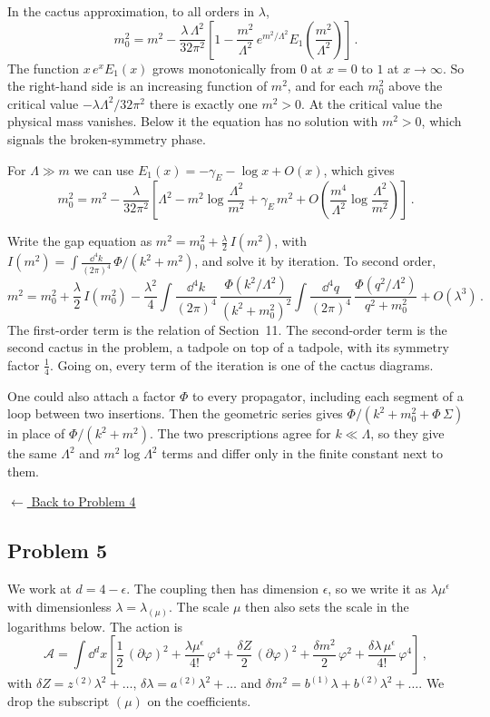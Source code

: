  In the cactus approximation, to all orders in $\lambda$,
\[
m_0^2=m^2-\frac{\lambda\,\Lambda^2}{32\pi^2}\left[1-\frac{m^2}{\Lambda^2}\,e^{m^2/\Lambda^2}E_1\left(\frac{m^2}{\Lambda^2}\right)\right]\,.
\]
The function $x\,e^xE_1(x)$ grows monotonically from $0$ at $x=0$ to $1$ at
$x\to\infty$. So the right-hand side is an increasing function of $m^2$, and for
each $m_0^2$ above the critical value $-\lambda\Lambda^2/32\pi^2$ there is exactly
one $m^2>0$. At the critical value the physical mass vanishes. Below it the
equation has no solution with $m^2>0$, which signals the broken-symmetry phase.

For $\Lambda\gg m$ we can use $E_1(x)=-\gamma_E-\log x+O(x)$, which gives
\[
m_0^2=m^2-\frac\lambda{32\pi^2}\left[\Lambda^2-m^2\log\frac{\Lambda^2}{m^2}+\gamma_E\,m^2+O\left(\frac{m^4}{\Lambda^2}\log\frac{\Lambda^2}{m^2}\right)\right]\,.
\]

 Write the gap equation as $m^2=m_0^2+\frac\lambda2\,I(m^2)$, with
$I(m^2)=\int\frac{\dd^4k}{(2\pi)^4}\,\Phi/(k^2+m^2)$, and solve it by iteration.
To second order,
\[
m^2=m_0^2+\frac\lambda2\,I(m_0^2)
-\frac{\lambda^2}4\int\frac{\dd^4k}{(2\pi)^4}\,\frac{\Phi(k^2/\Lambda^2)}{(k^2+m_0^2)^2}\int\frac{\dd^4q}{(2\pi)^4}\,\frac{\Phi(q^2/\Lambda^2)}{q^2+m_0^2}+O(\lambda^3)\,.
\]
The first-order term is the relation of Section~11. The second-order term is
the second cactus in the problem, a tadpole on top of a tadpole, with its
symmetry factor $\frac14$. Going on, every term of the iteration is one of the
cactus diagrams.

One could also attach a factor $\Phi$ to every propagator, including each
segment of a loop between two insertions. Then the geometric series gives
$\Phi/(k^2+m_0^2+\Phi\,\Sigma)$ in place of $\Phi/(k^2+m^2)$. The two
prescriptions agree for $k\ll\Lambda$, so they give the same $\Lambda^2$ and
$m^2\log\Lambda^2$ terms and differ only in the finite constant next to them.

\noindent\hyperref[hw:4]{$\leftarrow$ Back to Problem 4}

\subsection{Problem 5}\label{sol:5}

 We work at $d=4-\epsilon$. The coupling then has
dimension $\epsilon$, so we write it as $\lambda\mu^\epsilon$ with dimensionless
$\lambda=\lambda_{(\mu)}$. The scale $\mu$ then also sets the scale in the
logarithms below. The action is
\[
\mathcal A=\int \dd^dx\left[\frac12\,(\partial\varphi)^2+\frac{\lambda\mu^\epsilon}{4!}\,\varphi^4
+\frac{\delta Z}2\,(\partial\varphi)^2+\frac{\delta m^2}2\,\varphi^2+\frac{\delta\lambda\,\mu^\epsilon}{4!}\,\varphi^4\right]\,,
\]
with $\delta Z=z^{(2)}\lambda^2+\dots$, $\delta\lambda=a^{(2)}\lambda^2+\dots$ and
$\delta m^2=b^{(1)}\lambda+b^{(2)}\lambda^2+\dots$. We drop the subscript
$(\mu)$ on the coefficients.

